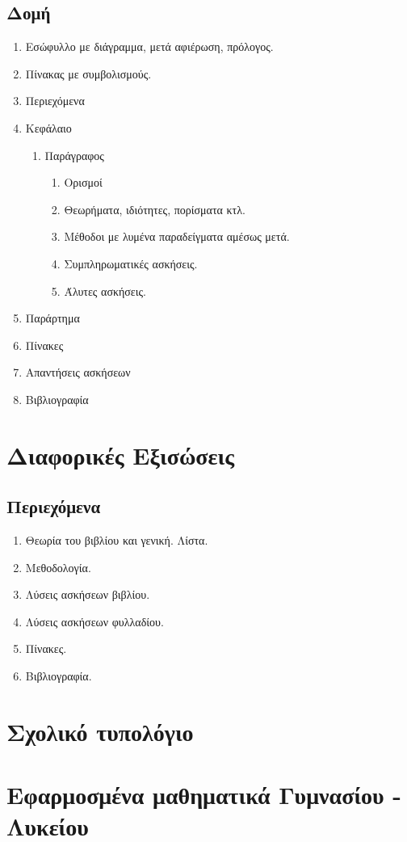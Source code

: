\documentclass[11pt,a4paper]{book}
\begin{document}
\subsection{Δομή}
\begin{enumerate}
\item Εσώφυλλο με διάγραμμα, μετά αφιέρωση, πρόλογος.
\item Πίνακας με συμβολισμούς.
\item Περιεχόμενα
\item Κεφάλαιο
\begin{enumerate}
\item Παράγραφος
\begin{enumerate}
\item Ορισμοί
\item Θεωρήματα, ιδιότητες, πορίσματα κτλ.
\item Μέθοδοι με λυμένα παραδείγματα αμέσως μετά.
\item Συμπληρωματικές ασκήσεις.
\item Άλυτες ασκήσεις.
\end{enumerate}
\end{enumerate}
\item Παράρτημα
\item Πίνακες
\item Απαντήσεις ασκήσεων
\item Βιβλιογραφία
\end{enumerate}
\section{Διαφορικές Εξισώσεις}
\subsection{Περιεχόμενα}
\begin{enumerate}
\item Θεωρία του βιβλίου και γενική. Λίστα.
\item Μεθοδολογία.
\item Λύσεις ασκήσεων βιβλίου.
\item Λύσεις ασκήσεων φυλλαδίου.
\item Πίνακες.
\item Βιβλιογραφία.
\end{enumerate}
\section{Σχολικό τυπολόγιο}
\section{Εφαρμοσμένα μαθηματικά Γυμνασίου - Λυκείου}
\end{document}
